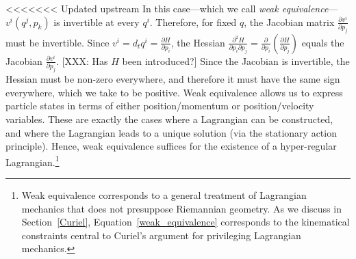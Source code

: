 \documentclass[letterpaper]{article}
\begin{document}
<<<<<<< Updated upstream
In this case---which we call \textit{weak equivalence}---$v^i(q^j, p_k)$ is invertible at every $q^i$. Therefore, for fixed $q$, the Jacobian matrix  $\frac{\partial v^i}{\partial p_j}$ must be invertible. Since $v^i = d_t q^i = \frac{\partial H}{\partial p_i}$, the Hessian $\frac{\partial^2 H}{\partial p_i \partial p_j} = \frac{\partial}{\partial p_i} (\frac{\partial H}{\partial p_j})$ equals the Jacobian $\frac{\partial v^i}{\partial p_j}$. [XXX: Has $H$ been introduced?] Since the Jacobian is invertible, the Hessian must be non-zero everywhere, and therefore it must have the same sign everywhere, which we take to be positive. Weak equivalence allows us to express particle states in terms of either position/momentum or position/velocity variables. These are exactly the cases where a Lagrangian can be constructed, and where the Lagrangian leads to a unique solution (via the stationary action principle). Hence, weak equivalence suffices for the existence of a hyper-regular Lagrangian.\footnote{Weak equivalence corresponds to a general treatment of Lagrangian mechanics that does not presuppose Riemannian geometry. As we discuss in Section~\ref{Curiel}, Equation~\ref{weak_equivalence} corresponds to the kinematical constraints central to Curiel's \parencites*[]{Curiel} argument for privileging Lagrangian mechanics.}
\end{document}
